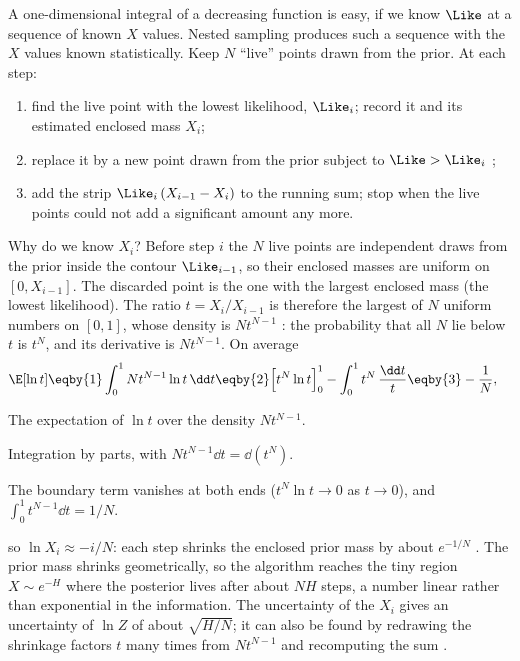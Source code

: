 A one-dimensional integral of a decreasing function is easy, if we know $\Like$ at a
sequence of known $X$ values. Nested sampling produces such a sequence with the $X$
values known statistically. Keep $N$ ``live'' points drawn from the prior. At each step:
\begin{enumerate}[itemsep=1pt,leftmargin=1.6em]
  \item find the live point with the lowest likelihood, $\Like_i$; record it and its
        estimated enclosed mass $X_i$;
  \item replace it by a new point drawn from the prior subject to $\Like>\Like_i$
        ;
  \item add the strip $\Like_i\,(X_{i-1}-X_i)$ to the running sum; stop when the live
        points could not add a significant amount any more.
\end{enumerate}
Why do we know $X_i$? Before step $i$ the $N$ live points are independent draws from the
prior inside the contour $\Like_{i-1}$, so their enclosed masses are uniform on
$[0,X_{i-1}]$. The discarded point is the one with the largest enclosed mass (the lowest
likelihood). The ratio $t=X_i/X_{i-1}$ is therefore the largest of $N$ uniform numbers on
$[0,1]$, whose density is $Nt^{N-1}$ : the probability that
all $N$ lie below $t$ is $t^N$, and its derivative is $Nt^{N-1}$. On average
\begin{align}
  \E[\ln t]
  &\eqby{1}\int_0^1Nt^{N-1}\ln t\,\dd t
   \eqby{2}\Bigl[t^N\ln t\Bigr]_0^1-\int_0^1t^{N}\,\frac{\dd t}{t}
   \eqby{3}-\frac1N ,
  \label{5c:eq:shrink}
\end{align}
\begin{explain}
  \item The expectation of $\ln t$ over the density $Nt^{N-1}$.
  \item Integration by parts, with $Nt^{N-1}\dd t=\dd(t^N)$.
  \item The boundary term vanishes at both ends ($t^N\ln t\to0$ as $t\to0$), and
        $\int_0^1t^{N-1}\dd t=1/N$.
\end{explain}
so $\ln X_i\approx-i/N$: each step shrinks the enclosed prior mass by about $e^{-1/N}$
. The prior mass shrinks geometrically, so the algorithm reaches
the tiny region $X\sim e^{-H}$ where the posterior lives after about $NH$ steps, a number
linear rather than exponential in the information. The uncertainty of the $X_i$ gives an
uncertainty of $\ln Z$ of about $\sqrt{H/N}$; it can also be found by redrawing the
shrinkage factors $t$ many times from $Nt^{N-1}$ and recomputing the sum
.

